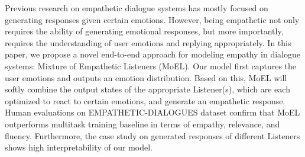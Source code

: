 Previous research on empathetic dialogue systems has mostly focused on generating responses given certain emotions. However, being empathetic not only requires the ability of generating emotional responses, but more importantly, requires the understanding of user emotions and replying appropriately. In this paper, we propose a novel end-to-end approach for modeling empathy in dialogue systems: Mixture of Empathetic Listeners (MoEL). Our model first captures the user emotions and outputs an emotion distribution. Based on this, MoEL will softly combine the output states of the appropriate Listener(s), which are each optimized to react to certain emotions, and generate an empathetic response.
Human evaluations on EMPATHETIC-DIALOGUES dataset confirm that MoEL outperforms multitask training baseline in terms of empathy, relevance, and fluency. Furthermore, the case study on generated responses of different Listeners shows high interpretability of our model.